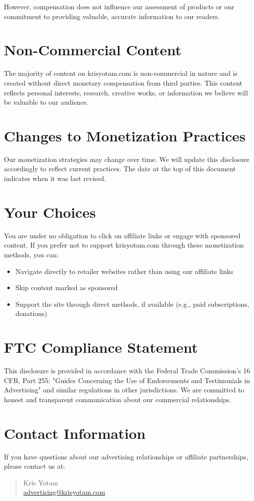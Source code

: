 \documentclass[11pt]{article}
\begin{document}
However, compensation does not influence our assessment of products or our commitment to providing valuable, accurate information to our readers.

\section{Non-Commercial Content}
The majority of content on krisyotam.com is non-commercial in nature and is created without direct monetary compensation from third parties. This content reflects personal interests, research, creative works, or information we believe will be valuable to our audience.

\section{Changes to Monetization Practices}
Our monetization strategies may change over time. We will update this disclosure accordingly to reflect current practices. The date at the top of this document indicates when it was last revised.

\section{Your Choices}
You are under no obligation to click on affiliate links or engage with sponsored content. If you prefer not to support krisyotam.com through these monetization methods, you can:
\begin{itemize}
  \item Navigate directly to retailer websites rather than using our affiliate links
  \item Skip content marked as sponsored
  \item Support the site through direct methods, if available (e.g., paid subscriptions, donations)
\end{itemize}

\section{FTC Compliance Statement}
This disclosure is provided in accordance with the Federal Trade Commission's 16 CFR, Part 255: "Guides Concerning the Use of Endorsements and Testimonials in Advertising" and similar regulations in other jurisdictions. We are committed to honest and transparent communication about our commercial relationships.

\section{Contact Information}
If you have questions about our advertising relationships or affiliate partnerships, please contact us at:
\begin{quote}
  Kris Yotam\\
  \href{mailto:advertising@krisyotam.com}{advertising@krisyotam.com}
\end{quote}
\end{document}
